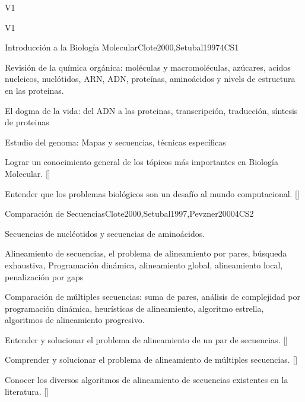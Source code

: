 \begin{syllabus}
\begin{specificoutcomes}{V1}
    \item {}

\end{specificoutcomes}

\begin{competences}{V1}
    \item {} 
    \item {}
    \item {}
\end{competences}

\begin{unit}{Introducción a la Biología Molecular}{}{Clote2000,Setubal1997}{4}{CS1}
\begin{topics}
    \item Revisión de la química orgánica: moléculas y macromoléculas, azúcares, acidos nucleicos, nuclótidos, ARN, ADN, proteínas, aminoácidos y nivels de estructura en las proteinas. 
    \item El dogma de la vida: del ADN a las proteinas, transcripción, traducción, síntesis de proteinas
    \item Estudio del genoma: Mapas y secuencias, técnicas específicas
\end{topics}
\begin{learningoutcomes}
    \item  Lograr un conocimiento general de los tópicos más importantes en Biología Molecular. [\Familiarity]
    \item Entender que los problemas biológicos son un desafío al mundo computacional. [\Assessment]
\end{learningoutcomes}
\end{unit}

\begin{unit}{Comparación de Secuencias}{}{Clote2000,Setubal1997,Pevzner2000}{4}{CS2}
\begin{topics}
    \item Secuencias de nucléotidos y secuencias de aminoácidos.
    \item Alineamiento de secuencias, el problema de alineamiento por pares, búsqueda exhaustiva, Programación dinámica, alineamiento global, alineamiento local, penalización por gaps
    \item Comparación de múltiples secuencias: suma de pares, análisis de complejidad por programación dinámica, heurísticas de alineamiento, algoritmo estrella, algoritmos de alineamiento progresivo.
\end{topics}
\begin{learningoutcomes}
    \item  Entender y solucionar el problema de alineamiento de un par de secuencias. [\Usage]
    \item  Comprender y solucionar el problema de alineamiento de múltiples secuencias. [\Usage]
    \item Conocer los diversos algoritmos de alineamiento de secuencias existentes en la literatura. [\Familiarity]
\end{learningoutcomes}
\end{unit}


\end{syllabus}
